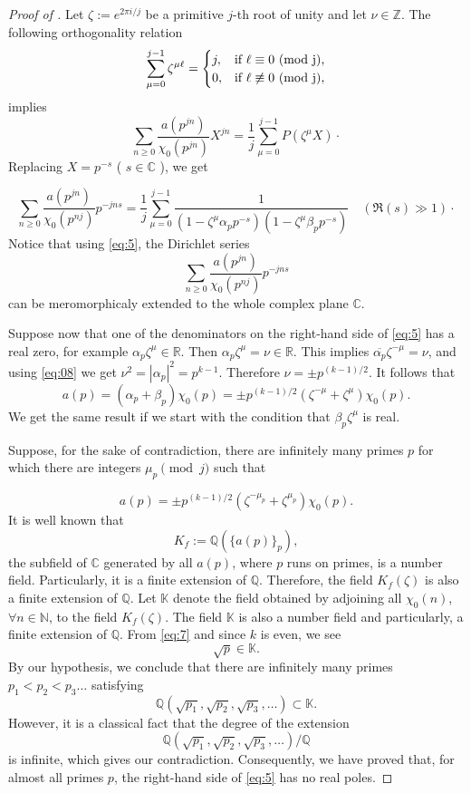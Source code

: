 \documentclass[smallcondensed]{svjour3}
\begin{document}
\begin{proof}[Proof of ]
Let $\zeta:=e^{2\pi i/j}$ be a primitive $j$-th root of unity and let $\nu\in{\mathbb Z}$. The following orthogonality relation
\begin{displaymath}
\sum_{\mu=0}^{j-1}\zeta^{\mu\ell}=
\begin{cases}
j, & \text{if $\ell\equiv 0$ {\rm (mod j),}}\\
0, & \text{if $\ell\not\equiv 0$ {\rm (mod j),}}
\end{cases}
\end{displaymath}
implies
$$
\sum_{n\ge0}\frac{a(p^{jn})}{\chi_{0}(p^{jn})}X^{jn}=\frac{1}{j}\sum_{\mu=0}^{j-1}P(\zeta^{\mu}X)\cdot
$$
Replacing $X=p^{-s}$ ( $s\in{\mathbb C}$ ), we get

\begin{equation}
\sum_{n\ge0}\frac{a(p^{jn})}{\chi_{0}(p^{nj})}p^{-jns}=\frac{1}{j}\sum_{\mu=0}^{j-1}\dfrac{1}{(1-\zeta^{\mu}\alpha_p p^{-s})(1-\zeta^{\mu}\beta_p p^{-s})}\quad (\Re(s)\gg1)\cdot\label{eq:5}
\end{equation}
Notice that using \eqref{eq:5},  the Dirichlet series 
$$
\sum_{n\ge0}\frac{a(p^{jn})}{\chi_{0}(p^{nj})}p^{-jns}
$$ 
can be meromorphicaly extended to the whole complex plane $\mathbb{C}$.

Suppose now that one of the denominators on the right-hand side of \eqref{eq:5} has a real zero, for example $\alpha_{p}\zeta^{\mu}\in{\mathbb R}$. Then $\alpha_p\zeta^{\mu}=\nu\in{\mathbb R}$. This implies $\overline{\alpha_p}\zeta^{-\mu}=\nu$, and using \eqref{eq:08} we get $\nu^2=|\alpha_p|^2= p^{k-1}$. Therefore $\nu=\pm p^{(k-1)/2}$. It follows that
$$
a(p)=(\alpha_p+\beta_p)\chi_{0}(p)=\pm p^{(k-1)/2}(\zeta^{-\mu}+\zeta^{\mu})\chi_{0}(p).
$$
We get the same result if we start with the condition that $\beta_p\zeta^\mu$ is real.

Suppose, for the sake of contradiction, there are infinitely many primes $p$ for which there are integers $\mu_p\pmod j$
such that

\begin{equation}
a(p)=\pm p^{(k-1)/2}(\zeta^{-\mu_p}+\zeta^{\mu_p})\chi_{0}(p).\label{eq:7}
\end{equation}
It is well known that 
$$
K_f:={\mathbb Q}(\{a(p)\}_p),
$$
the subfield of ${\mathbb C}$ generated by all $a(p)$, where $p$ runs on primes, is a number field. Particularly, it is a finite extension of ${\mathbb Q}$. Therefore, the field $K_{f}(\zeta)$ is also a finite extension of ${\mathbb Q}$. Let $\mathbb{K}$ denote the field obtained by adjoining all $\chi_{0}(n)$, $\forall n\in\mathbb{N}$, to the field $K_{f}(\zeta)$. The field $\mathbb{K}$ is also a number field and particularly, a finite extension of ${\mathbb Q}$. From \eqref{eq:7} and since $k$ is even, we see
$$
\sqrt{p}\in\mathbb{K}.
$$
By our hypothesis, we conclude that there are infinitely many primes $p_1<p_2<p_3\dots$ satisfying
$$
{\mathbb Q}(\sqrt{p_1},\sqrt{p_2},\sqrt{p_3},\ldots)\subset \mathbb{K}.
$$
However, it is a classical fact that the degree of the extension 
$$
{\mathbb Q}(\sqrt{p_1},\sqrt{p_2},\sqrt{p_3},\dots)/{\mathbb Q}
$$
is infinite, which gives our contradiction. Consequently, we have proved that, for almost all primes $p$, the right-hand side of \eqref{eq:5} has no real poles.  


\end{proof}
\end{document}
